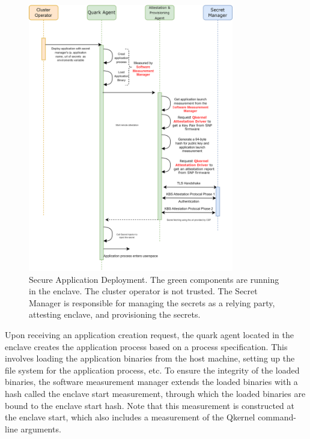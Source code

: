 \begin{figure}[H]
    \centering
    \includegraphics[width=0.8\textwidth]{images/attestation_provisioning.png}
    \caption[Secure Application Deployment Workflow]{Secure Application Deployment. The green components are running in the enclave. The cluster operator is not trusted. The Secret Manager is responsible for managing the secrets as a relying party, attesting  enclave, and provisioning the secrets.}
    \label{fig:attestation_provisioning}
\end{figure}

Upon receiving an application creation request, the quark agent located in the enclave creates the application process based on a process specification. This involves loading the application binaries from the host machine, setting up the file 
system for the application process, etc. To ensure the integrity of the loaded binaries, the software measurement manager extends the loaded binaries with a hash called the enclave start measurement, through which the loaded binaries are bound to 
the enclave start hash. Note that this measurement is constructed at the enclave start, which also includes a measurement of the Qkernel command-line arguments.

